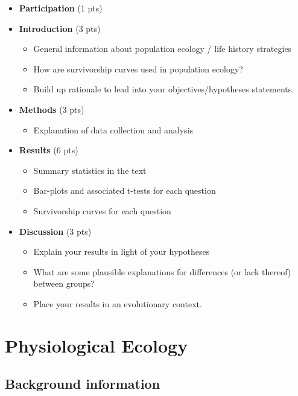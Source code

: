 \documentclass[]{book}
\providecommand{\tightlist}{%
  \setlength{\itemsep}{0pt}\setlength{\parskip}{0pt}}
\theoremstyle{definition}
\theoremstyle{definition}
\theoremstyle{definition}
\theoremstyle{remark}
\begin{document}
\begin{itemize}
\item
  \textbf{Participation} (1 pts)
\item
  \textbf{Introduction} (3 pts)

  \begin{itemize}
  \tightlist
  \item
    General information about population ecology / life history
    strategies
  \item
    How are survivorship curves used in population ecology?
  \item
    Build up rationale to lead into your objectives/hypotheses
    statements.
  \end{itemize}
\item
  \textbf{Methods} (3 pts)

  \begin{itemize}
  \tightlist
  \item
    Explanation of data collection and analysis
  \end{itemize}
\item
  \textbf{Results} (6 pts)

  \begin{itemize}
  \tightlist
  \item
    Summary statistics in the text
  \item
    Bar-plots and associated t-tests for each question
  \item
    Survivorship curves for each question
  \end{itemize}
\item
  \textbf{Discussion} (3 pts)

  \begin{itemize}
  \tightlist
  \item
    Explain your results in light of your hypotheses
  \item
    What are some plausible explanations for differences (or lack
    thereof) between groups?
  \item
    Place your results in an evolutionary context.
  \end{itemize}
\end{itemize}

\chapter{Physiological Ecology}\label{physiological-ecology}

\section{Background information}\label{background-information-1}
\end{document}
